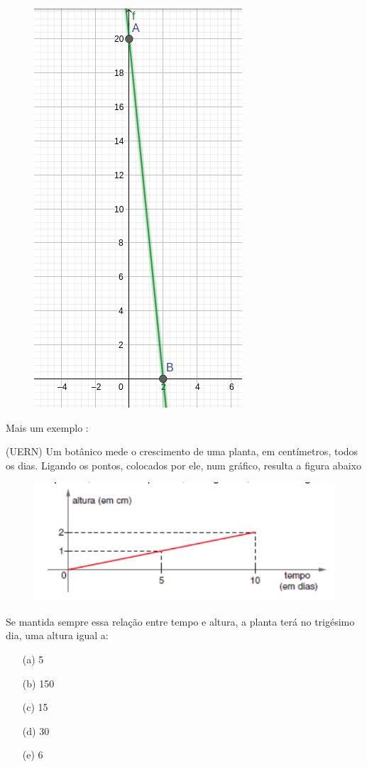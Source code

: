 \begin{multicols*}{2}
\begin{enumerate}
\begin{figure}[H]
                  \includegraphics[scale=0.3]{assets/rafael/img13.png}
              \end{figure}
    \end{enumerate}

    Mais um exemplo :

    (UERN) Um botânico mede o crescimento de uma planta, em centímetros, todos os dias. Ligando os 			pontos, colocados por ele, num gráfico, resulta a figura abaixo
    \begin{figure}[H]
        \centering
        \includegraphics[scale=0.4]{assets/rafael/img15.png}
    \end{figure}
    Se mantida sempre essa relação entre tempo e altura, a planta terá no trigésimo dia, uma altura 		igual a:
    \begin{enumerate}
        \item[(a)] 5
        \item[(b)] 150
        \item[(c)] 15
        \item[(d)] 30
        \item[(e)] 6
    \end{enumerate}


\end{multicols*}
